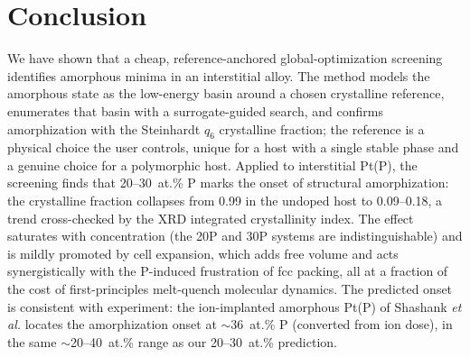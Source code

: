 
\section{Conclusion}\label{sec:conclusion}

We have shown that a cheap, reference-anchored global-optimization screening
identifies amorphous minima in an interstitial alloy. The method models the
amorphous state as the low-energy basin around a chosen crystalline reference,
enumerates that basin with a surrogate-guided search, and confirms
amorphization with the Steinhardt $q_6$ crystalline fraction; the reference is
a physical choice the user controls, unique for a host with a single stable
phase and a genuine choice for a polymorphic host. Applied to interstitial
Pt(P), the screening finds that 20--30~at.\% P marks the onset of structural
amorphization: the crystalline fraction collapses from 0.99 in the undoped host
to 0.09--0.18, a trend cross-checked by the XRD integrated crystallinity index.
The effect saturates with concentration (the 20P and 30P systems are
indistinguishable) and is mildly promoted by cell expansion, which adds free
volume and acts synergistically with the P-induced frustration of fcc packing,
all at a fraction of the cost of first-principles melt-quench molecular
dynamics. The predicted onset is consistent with experiment: the
ion-implanted amorphous Pt(P) of Shashank \emph{et al.} \cite{shashank2025}
locates the amorphization onset at $\sim$36~at.\% P (converted from ion
dose), in the same $\sim$20--40~at.\% range as our 20--30~at.\% prediction.

